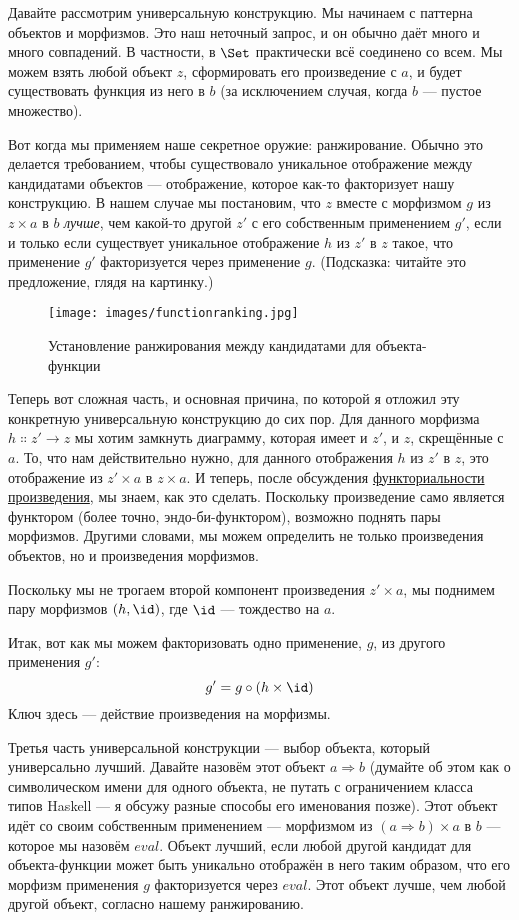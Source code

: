 Давайте рассмотрим универсальную конструкцию. Мы начинаем с паттерна
объектов и морфизмов. Это наш неточный запрос, и он обычно даёт
много и много совпадений. В частности, в $\Set$ практически
всё соединено со всем. Мы можем взять любой объект
$z$, сформировать его произведение с $a$, и будет существовать
функция из него в $b$ (за исключением случая, когда $b$ --- пустое множество).

Вот когда мы применяем наше секретное оружие: ранжирование. Обычно это делается
требованием, чтобы существовало уникальное отображение между кандидатами объектов ---
отображение, которое как-то факторизует нашу конструкцию. В нашем случае мы
постановим, что $z$ вместе с морфизмом $g$ из
$z \times a$ в $b$ \emph{лучше}, чем какой-то другой
$z'$ с его собственным применением $g'$, если и
только если существует уникальное отображение $h$ из $z'$ в
$z$ такое, что применение $g'$ факторизуется
через применение $g$. (Подсказка: читайте это предложение, глядя
на картинку.)

\begin{figure}[H]
  \centering
  \texttt{[image: images/functionranking.jpg]}
  \caption{Установление ранжирования между кандидатами для объекта-функции}
\end{figure}

\noindent
Теперь вот сложная часть, и основная причина, по которой я отложил эту
конкретную универсальную конструкцию до сих пор. Для данного морфизма
$h \Colon z'\to z$ мы хотим замкнуть диаграмму,
которая имеет и $z'$, и $z$, скрещённые с $a$.
То, что нам действительно нужно, для данного отображения $h$ из $z'$
в $z$, это отображение из $z' \times a$ в $z \times a$.
И теперь, после обсуждения \hyperref[functoriality]{функториальности
  произведения}, мы знаем, как это сделать. Поскольку произведение само является
функтором (более точно, эндо-би-функтором), возможно поднять пары
морфизмов. Другими словами, мы можем определить не только произведения объектов,
но и произведения морфизмов.

Поскольку мы не трогаем второй компонент произведения
$z' \times a$, мы поднимем пару морфизмов
$(h, \id)$, где $\id$ --- тождество на $a$.

Итак, вот как мы можем факторизовать одно применение, $g$, из другого
применения $g'$:
\[g' = g \circ (h \times \id)\]
Ключ здесь --- действие произведения на морфизмы.

Третья часть универсальной конструкции --- выбор объекта,
который универсально лучший. Давайте назовём этот объект $a \Rightarrow b$ (думайте
об этом как о символическом имени для одного объекта, не путать с
ограничением класса типов Haskell --- я обсужу разные способы его именования
позже). Этот объект идёт со своим собственным применением --- морфизмом
из $(a \Rightarrow b) \times a$ в $b$ --- которое мы назовём
$\mathit{eval}$. Объект  лучший, если любой другой
кандидат для объекта-функции может быть уникально отображён в него таким
образом, что его морфизм применения $g$ факторизуется через
$\mathit{eval}$. Этот объект лучше, чем любой другой объект, согласно
нашему ранжированию.

